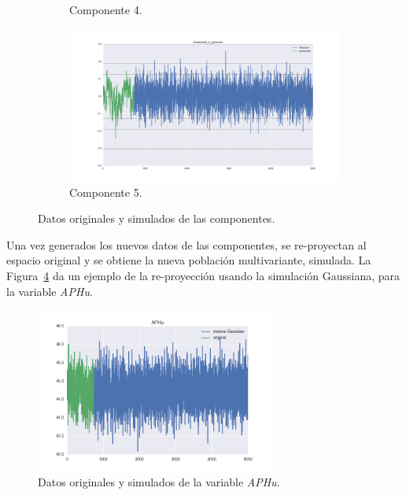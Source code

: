 \documentclass[11pt,spanish,listoffigures,listoftables]{tfgetsinf}
\begin{document}
\begin{figure}[H]
\begin{subfigure}[h]{0.49\textwidth}
            \caption{Componente 4.}
            \label{fig:component_4_gaussian}
        \end{subfigure}
        \begin{subfigure}[h]{0.49\textwidth}
            \centering
            \includegraphics[width=\textwidth]{component_5_gaussian.png}
            \caption{Componente 5.}
            \label{fig:component_5_gaussian}
        \end{subfigure}
        \caption{Datos originales y simulados de las componentes.}
        \label{fig:component_gaussian}
    \end{figure}
 
    Una vez generados los nuevos datos de las componentes, se re-proyectan al espacio original y se obtiene la nueva población multivariante, simulada. La Figura~\ref{fig:inverse_gaussian_APHu} da un ejemplo de la re-proyección usando la simulación Gaussiana, para la variable {\em APHu}.
    
    \begin{figure}[H]
        \centering
        \includegraphics[width=0.7\textwidth]{inverse_gaussian_APHu.png}
        \caption{Datos originales y simulados de la variable {\em APHu}.}
        \label{fig:inverse_gaussian_APHu}
    \end{figure}       
    
\end{document}
